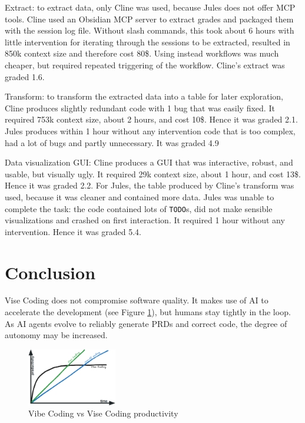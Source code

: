 \documentclass[twocolumn]{article}
\begin{document}
Extract: to extract data, only Cline was used, because Jules does not offer MCP tools. Cline used an Obsidian MCP server to extract grades
and packaged them with the session log file.
Without slash commands, this took about 6 hours with little intervention for iterating through the sessions to be extracted,
resulted in 850k context size and therefore cost 80\$. Using instead workflows was much cheaper,
but required repeated triggering of the workflow. Cline's extract was graded 1.6.

Transform: to transform the extracted data into a table for later exploration,
Cline produces slightly redundant code with 1 bug that was easily fixed.
It required 753k context size, about 2 hours, and cost 10\$. Hence it was graded 2.1.
Jules produces within 1 hour without any intervention code that is too complex, had a lot of bugs and partly unnecessary. 
It was graded 4.9

Data visualization GUI: Cline produces a GUI that was interactive, robust, and usable, but visually ugly.
It required 29k context size, about 1 hour, and cost 13\$. Hence it was graded 2.2.
For Jules, the table produced by Cline's transform was used, because it was cleaner and contained more data.
Jules was unable to complete the task: the code contained lots of \lstinline|TODO|s,
did not make sensible visualizations and crashed on first interaction.
It required 1 hour without any intervention. Hence it was graded 5.4.

\section{Conclusion}
Vise Coding does not compromise software quality.
It makes use of AI to accelerate the development (see Figure \ref{fig:vibevise}),
but humans stay tightly in the loop.
As AI agents evolve to reliably generate PRDs and correct code,
the degree of autonomy may be increased.

\begin{figure}[hbt!]
  \begin{center}
  \vspace{-2mm}
  \includegraphics[width=0.35\textwidth]{figures/vibe_vise_non_ai_v1}
  \vspace{-5mm}
\caption{Vibe Coding vs Vise Coding productivity}
\label{fig:vibevise}
\end{center}
\end{figure}


\tiny

\end{document}
